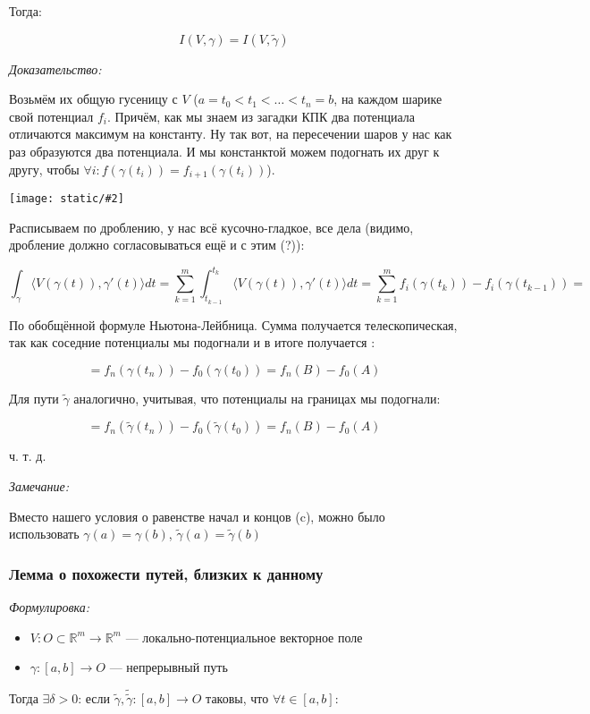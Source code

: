 \documentclass{article}
\def\images#1#2{\begin{center}\texttt{[image: static/\#2]}\end{center}}
\def\sk#1#2{\langle #1, #2 \rangle}
\begin{document}
Тогда:

\[I(V, \gamma) = I(V, \tilde{\gamma})\]

\textit{Доказательство:}

Возьмём их общую гусеницу с $V$ ($a = t_0 < t_1 < \ldots < t_n = b$, на каждом шарике свой потенциал $f_i$. Причём, как мы знаем из загадки КПК два потенциала отличаются максимум на константу. Ну так вот, на пересечении шаров у нас как раз образуются два потенциала. И мы констанктой можем подогнать их друг к другу, чтобы $\forall i: f(\gamma(t_i)) = f_{i + 1}(\gamma(t_i))$).

\images{0.5}{lemm_pohoshie_putiii.jpg}

Расписываем по дроблению, у нас всё кусочно-гладкое, все дела (видимо, дробление должно согласовываться ещё и с этим (?)):

\[\int_{\gamma} \sk{V(\gamma(t))}{\gamma'(t)} dt = \sum_{k = 1}^m \int_{t_{k - 1}}^{t_k} \sk{V(\gamma(t))}{\gamma'(t)} dt = \sum_{k = 1}^m f_i(\gamma(t_k)) - f_i(\gamma(t_{k - 1})) = \] 

По обобщённой формуле Ньютона-Лейбница. Сумма получается телескопическая, так как соседние потенциалы мы подогнали и в итоге получается :

\[= f_n(\gamma(t_n)) - f_0(\gamma(t_0)) = f_n(B) - f_0(A)\]

Для пути $\tilde{\gamma}$ аналогично, учитывая, что потенциалы на границах мы подогнали:

\[= f_n(\tilde{\gamma}(t_n)) - f_0(\tilde{\gamma}(t_0)) = f_n(B) - f_0(A)\]

ч. т. д. 

\textit{Замечание:}

Вместо нашего условия о равенстве начал и концов (c), можно было использовать $\gamma(a) = \gamma(b)$, $\tilde{\gamma}(a) = \tilde{\gamma}(b)$

\subsubsection{Лемма о похожести путей, близких к данному}
\textit{Формулировка:}

\begin{itemize}
    \item $V: O \subset \mathbb{R}^m \rightarrow \mathbb{R}^m$ --- локально-потенциальное векторное поле
    \item $\gamma: [a, b] \rightarrow O$ --- непрерывный путь
\end{itemize}

Тогда $\exists \delta > 0$: если $\tilde{\gamma}, \tilde{\tilde{\gamma}}: [a, b] \rightarrow O$ таковы, что $\forall t \in [a, b]$:
\end{document}
